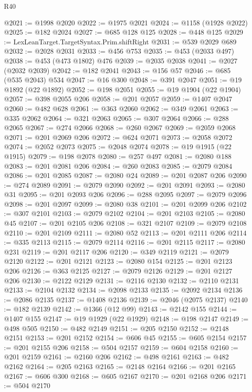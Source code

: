 \begin{lexlean}{R40}
\begin{coremodule}
@2021 := @1998 @2020
@2022 := @1975 @2021
@2024 := @1158 (@1928 @2022)
@2025 := @182 @2024
@2027 := @685 @128 @125
@2028 := @448 @125
@2029 := LexLeanTarget.TargetSyntax.Prim.shiftRight
@2031 := @539 @2029 @689
@2032 := @2028 @2031
@2033 := @456 @753
@2035 := @453 (@2033 @497)
@2038 := @453 (@473 @1802) @476
@2039 := @2035 @2038
@2041 := @2027 (@2032 @2039)
@2042 := @182 @2041
@2043 := @156 @57
@2046 := @685 (@535 @2043) @534
@2047 := @16 @300
@2048 := @391 @2047
@2051 := @19 @1892 (@22 @1892)
@2052 := @198 @2051
@2055 := @19 @1904 (@22 @1904)
@2057 := @398 @2055 @206
@2058 := @201 @2057
@2059 := @1407 @2047
@2060 := @482 @628
@2061 := @363 @2060
@2062 := @349 @2061
@2063 := @335 @2062
@2064 := @321 @2063
@2065 := @307 @2064
@2066 := @288 @2065
@2067 := @274 @2066
@2068 := @260 @2067
@2069 := @2059 @2068
@2071 := @201 @2069 @206
@2072 := @624 @2071
@2073 := @2058 @2072
@2074 := @2052 @2073
@2075 := @2048 @2074
@2078 := @19 @1915 (@22 @1915)
@2079 := @198 @2078
@2080 := @257 @497
@2081 := @2080 @188
@2083 := @201 @2081 @206
@2084 := @260 @2083
@2085 := @2079 @2084
@2086 := @201 @2085
@2087 := @2080 @24
@2089 := @201 @2087 @206
@2090 := @274 @2089
@2091 := @2079 @2090
@2092 := @201 @2091
@2093 := @2080 @31
@2095 := @201 @2093 @206
@2096 := @288 @2095
@2097 := @2079 @2096
@2098 := @201 @2097
@2099 := @2080 @38
@2101 := @201 @2099 @206
@2102 := @307 @2101
@2103 := @2079 @2102
@2104 := @201 @2103
@2105 := @2080 @45
@2107 := @201 @2105 @206
@2108 := @321 @2107
@2109 := @2079 @2108
@2110 := @201 @2109
@2111 := @2080 @52
@2113 := @201 @2111 @206
@2114 := @335 @2113
@2115 := @2079 @2114
@2116 := @201 @2115
@2117 := @2080 @231
@2119 := @201 @2117 @206
@2120 := @349 @2119
@2121 := @2079 @2120
@2122 := @201 @2121
@2123 := @2080 @154
@2125 := @201 @2123 @206
@2126 := @363 @2125
@2127 := @2079 @2126
@2129 := @201 @2127 @206
@2130 := @2122 @2129
@2131 := @2116 @2130
@2132 := @2110 @2131
@2133 := @2104 @2132
@2134 := @2098 @2133
@2135 := @2092 @2134
@2136 := @2086 @2135
@2137 := @1408 @2136
@2139 := @2046 (@2075 @2137)
@2140 := @182 @2139
@2142 := @1366 (@12 @99)
@2143 := @2142 @155
@2144 := @1407 @155
@2147 := @19 @1929 (@22 @1929)
@2148 := @198 @2147
@2149 := @498 @505
@2150 := @482 @2149
@2151 := @205 @2150
@2152 := @2148 @2151
@2153 := @201 @2152
@2154 := @606 @45
@2155 := @605 @2154
@2157 := @201 @2155 @206
@2158 := @504 @2157
@2159 := @604 @2158
@2160 := @201 @2159
@2161 := @2160 @206
@2162 := @498 @2161
@2163 := @482 @2162
@2164 := @205 @2163
@2165 := @2148 @2164
@2166 := @201 @2165
@2167 := @606 @300
@2168 := @605 @2167
@2170 := @201 @2168 @206
@2171 := @504 @2170

\end{coremodule}
\end{lexlean}
